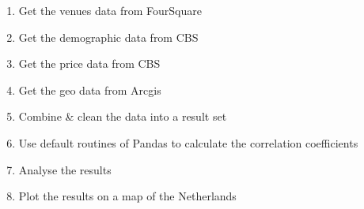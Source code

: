 \medskip
\begin{enumerate}
	\item Get the venues data from FourSquare
	\item Get the demographic data from CBS
	\item Get the price data from CBS
	\item Get the geo data from Arcgis
	\item Combine \& clean the data into a result set
	\item Use default routines of Pandas to calculate the correlation coefficients
	\item Analyse the results
	\item Plot the results on a map of the Netherlands
\end{enumerate}
\medskip
